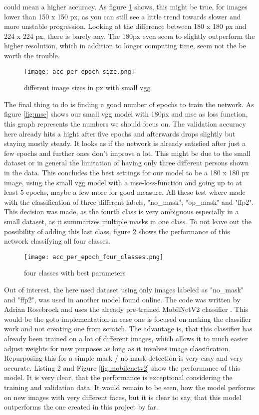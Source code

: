 could mean a higher accuracy. As figure \ref{fig:size} shows, this might be
true, for images lower than 150 x 150 px, as you can still see a little trend
towards slower and more unstable progression. Looking at the difference between
180 x 180 px and 224 x 224 px, there is barely any. The 180px even seem to
slightly outperform the higher resolution, which in addition to longer computing
time, seem not the be worth the trouble.
\begin{figure}
    \centering
    \texttt{[image: acc\_per\_epoch\_size.png]}
    \caption{different image sizes in px with small vgg}
    \label{fig:size}
\end{figure}
The final thing to do is finding a good number of epochs to train the network.
As figure \ref{fig:mse} shows our small vgg model with 180px and mse as loss
function, this graph represents the numbers we should focus on. The validation
accuracy here already hits a hight after five epochs and afterwards drops
slightly but staying mostly steady. It looks as if the network is already
satisfied after just a few epochs and further ones don't improve a lot. This
might be due to the small dataset or in general the limitation of having only
three different persons shown in the data.
\newline
This concludes the best settings for our model to be a 180 x 180 px image, using
the small vgg model with a mse-loss-function and going up to at least 5 epochs,
maybe a few more for good measure.
\newline
All these test where made with the classification of three different labels,
"no\_mask", "op\_mask" and "ffp2". This decision was made, as the fourth class
is very ambiguous especially in a small dataset, as it summarizes multiple masks
in one class. To not leave out the possibility of adding this last class, figure
\ref{fig:four} shows the performance of this network classifying all four classes.
\begin{figure}
    \centering
    \texttt{[image: acc\_per\_epoch\_four\_classes.png]}
    \caption{four classes with best parameters}
    \label{fig:four}
\end{figure}
\newline
Out of interest, the here used dataset using only images labeled as "no\_mask"
and "ffp2", was used in another model found online. The code was written by
Adrian Rosebrock and uses the already pre-trained MobilNetV2 classifier
\cite{Rosebrock2020}. This would be the goto implementation in case one is focused
on making the classifier work and not creating one from scratch. The advantage
is, that this classifier has already been trained on a lot of different images,
which allows it to much easier adjust weights for new purposes as long as it
involves image classification. Repurposing this for a simple mask / no mask
detection is very easy and very accurate. Listing 2 and Figure
\ref{fig:mobilenetv2} show the performance of this model. It is very clear, that
the performance is exceptional considering the training and validation data. It
would remain to be seen, how the model performs on new images with very
different faces, but it is clear to say, that this model outperforms the one
created in this project by far.

